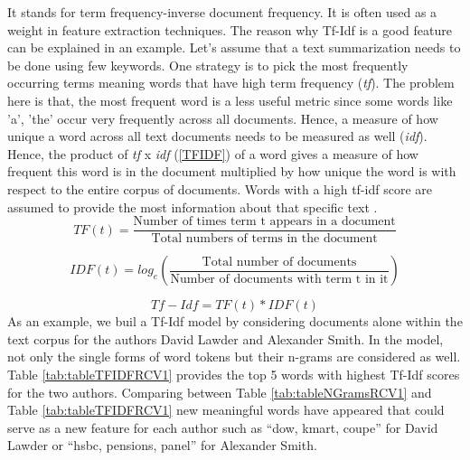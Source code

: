 It stands for term frequency-inverse document frequency. It is often used as a weight in feature extraction techniques. The reason why Tf-Idf is a good feature can be explained in an example. Let’s assume that a text summarization needs to be done using few keywords. One strategy is to pick the most frequently occurring
terms meaning words that have high term frequency (\textit{tf}). The problem here is that, the most frequent word is a less useful metric since some words like ’a’, ’the’ occur very frequently across all documents. Hence, a measure of how unique a word across all text documents needs to be measured as well (\textit{idf}). Hence, the product of \textit{tf} x \textit{idf} (\ref{TFIDF}) of a word gives a measure of how frequent this word is in the document multiplied by how unique the word is with respect to the entire corpus of documents. Words with a high tf-idf score are assumed to provide the most information about that specific text \cite{stamatatos2009survey}.
\begin{equation}\label{TF}
		TF(t) = \frac{\text{Number of times term t appears in a document}}{\text{Total numbers of terms in the document}}
\end{equation}

\begin{equation}\label{IDF}
	IDF(t) = log_e(\frac{\text{Total number of documents}}{\text{Number of documents with term t in it}}) 
\end{equation}

\begin{equation}\label{TFIDF}
	Tf - Idf = TF(t) * IDF(t)
\end{equation}
As an example, we buil a Tf-Idf model by considering documents alone within the text corpus for the authors David Lawder and Alexander Smith.
In the model, not only the single forms of word tokens but their n-grams are considered as well. Table \ref{tab:tableTFIDFRCV1} provides the top 5 words with highest Tf-Idf scores for the two authors. Comparing between Table \ref{tab:tableNGramsRCV1} and Table \ref{tab:tableTFIDFRCV1} new meaningful words have appeared that could serve as a new feature for each author such as “dow, kmart, coupe” for David Lawder or “hsbc, pensions, panel” for Alexander Smith.

